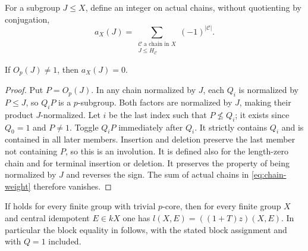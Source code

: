 For a subgroup $J\leq X$, define an integer on actual chains,
without quotienting by conjugation,
\begin{equation}\label{eq:chain-weight}
 a_X(J)=
 \sum_{\substack{\mathcal C\text{ a chain in }X\\
                  J\leq H_{\mathcal C}}}(-1)^{|\mathcal C|}.
\end{equation}

\begin{lemma}
\label{lem:pcore-cancellation}
If $O_p(J)\ne1$, then $a_X(J)=0$.
\end{lemma}

\begin{proof}
Put $P=O_p(J)$. In any chain normalized by $J$, each $Q_i$ is
normalized by $P\leq J$, so $Q_iP$ is a $p$-subgroup. Both
factors are normalized by $J$, making their product
$J$-normalized. Let $i$ be the last index such that $P\nleq Q_i$;
it exists since $Q_0=1$ and $P\ne1$. Toggle $Q_iP$ immediately
after $Q_i$. It strictly contains $Q_i$ and is contained in all
later members. Insertion and deletion preserve the last member
not containing $P$, so this is an involution. It is defined also
for the length-zero chain and for terminal insertion or deletion.
It preserves the property of being normalized by $J$ and reverses
the sign. The sum of actual chains in \eqref{eq:chain-weight}
therefore vanishes.
\end{proof}

\begin{proposition}
\label{prop:group-reduction}
If  holds for every finite group with
trivial $p$-core, then for every finite group $X$ and central
idempotent $E\in kX$ one has $l(X,E)=((1+T)z)(X,E)$.
In particular the block equality in  follows, with
the stated block assignment and with $Q=1$ included.
\end{proposition}

